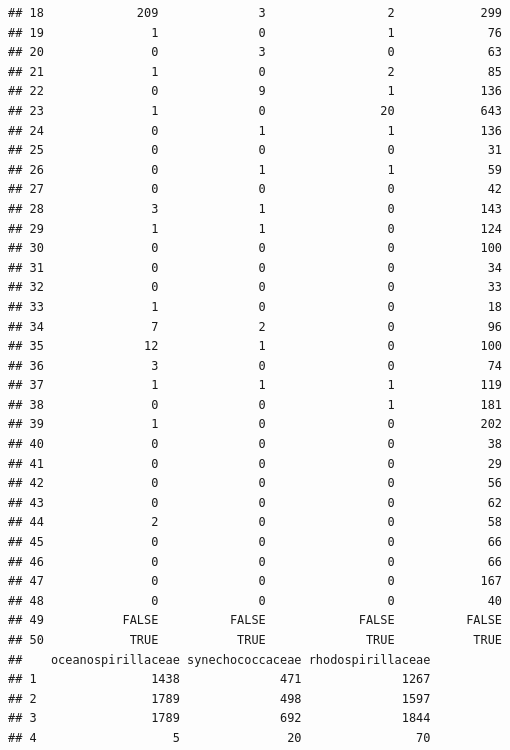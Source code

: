 \documentclass[10pt,handout,english]{beamer}\usepackage[]{graphicx}\usepackage[]{color}
\makeatletter
\newenvironment{kframe}{%
 \def\at@end@of@kframe{}%
 \ifinner\ifhmode%
  \def\at@end@of@kframe{\end{minipage}}%
  \begin{minipage}{\columnwidth}%
 \fi\fi%
 \def\FrameCommand##1{\hskip\@totalleftmargin \hskip-\fboxsep
 \colorbox{shadecolor}{##1}\hskip-\fboxsep
     \hskip-\linewidth \hskip-\@totalleftmargin \hskip\columnwidth}%
 \MakeFramed {\advance\hsize-\width
   \@totalleftmargin\z@ \linewidth\hsize
   \@setminipage}}%
 {\par\unskip\endMakeFramed%
 \at@end@of@kframe}
\newenvironment{knitrout}{}{} %
\makeatother
\begin{document}
\begin{frame}[fragile]
\begin{knitrout}
\begin{kframe}
\begin{verbatim}
## 18             209              3                 2            299
## 19               1              0                 1             76
## 20               0              3                 0             63
## 21               1              0                 2             85
## 22               0              9                 1            136
## 23               1              0                20            643
## 24               0              1                 1            136
## 25               0              0                 0             31
## 26               0              1                 1             59
## 27               0              0                 0             42
## 28               3              1                 0            143
## 29               1              1                 0            124
## 30               0              0                 0            100
## 31               0              0                 0             34
## 32               0              0                 0             33
## 33               1              0                 0             18
## 34               7              2                 0             96
## 35              12              1                 0            100
## 36               3              0                 0             74
## 37               1              1                 1            119
## 38               0              0                 1            181
## 39               1              0                 0            202
## 40               0              0                 0             38
## 41               0              0                 0             29
## 42               0              0                 0             56
## 43               0              0                 0             62
## 44               2              0                 0             58
## 45               0              0                 0             66
## 46               0              0                 0             66
## 47               0              0                 0            167
## 48               0              0                 0             40
## 49           FALSE          FALSE             FALSE          FALSE
## 50            TRUE           TRUE              TRUE           TRUE
##    oceanospirillaceae synechococcaceae rhodospirillaceae
## 1                1438              471              1267
## 2                1789              498              1597
## 3                1789              692              1844
## 4                   5               20                70

\end{verbatim}
\end{kframe}
\end{knitrout}
\end{frame}
\end{document}
